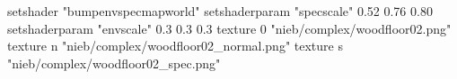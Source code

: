 setshader "bumpenvspecmapworld"
setshaderparam "specscale" 0.52 0.76 0.80
setshaderparam "envscale"  0.3 0.3 0.3
   texture 0 "nieb/complex/woodfloor02.png"
   texture n "nieb/complex/woodfloor02_normal.png"
   texture s "nieb/complex/woodfloor02_spec.png"